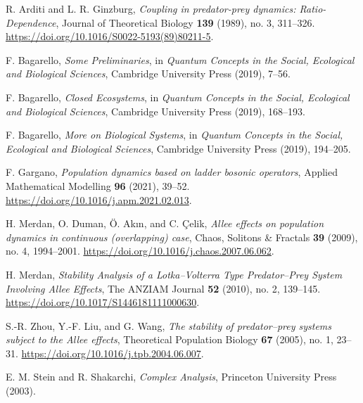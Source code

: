 \documentclass[11pt,reqno]{amsart}
\numberwithin{equation}{section}
\theoremstyle{plain}
\begin{document}
\begin{thebibliography}{ABGM19} %

R. Arditi and L. R. Ginzburg, \emph{Coupling in predator-prey dynamics: Ratio-Dependence}, Journal of Theoretical Biology \textbf{139} (1989), no. 3, 311--326. \href{https://doi.org/10.1016/S0022-5193(89)80211-5}{https://doi.org/10.1016/S0022-5193(89)80211-5}.

F. Bagarello, \emph{Some Preliminaries}, in \emph{Quantum Concepts in the Social, Ecological and Biological Sciences}, Cambridge University Press (2019), 7--56.

F. Bagarello, \emph{Closed Ecosystems}, in \emph{Quantum Concepts in the Social, Ecological and Biological Sciences}, Cambridge University Press (2019), 168--193.

F. Bagarello, \emph{More on Biological Systems}, in \emph{Quantum Concepts in the Social, Ecological and Biological Sciences}, Cambridge University Press (2019), 194--205.

F. Gargano, \emph{Population dynamics based on ladder bosonic operators}, Applied Mathematical Modelling \textbf{96} (2021), 39--52. \href{https://doi.org/10.1016/j.apm.2021.02.013}{https://doi.org/10.1016/j.apm.2021.02.013}.

H. Merdan, O. Duman, Ö. Akın, and C. Çelik, \emph{Allee effects on population dynamics in continuous (overlapping) case}, Chaos, Solitons \& Fractals \textbf{39} (2009), no. 4, 1994--2001. \href{https://doi.org/10.1016/j.chaos.2007.06.062}{https://doi.org/10.1016/j.chaos.2007.06.062}.

H. Merdan, \emph{Stability Analysis of a Lotka–Volterra Type Predator–Prey System Involving Allee Effects}, The ANZIAM Journal \textbf{52} (2010), no. 2, 139--145. \href{https://doi.org/10.1017/S1446181111000630}{https://doi.org/10.1017/S1446181111000630}.

S.-R. Zhou, Y.-F. Liu, and G. Wang, \emph{The stability of predator–prey systems subject to the Allee effects}, Theoretical Population Biology \textbf{67} (2005), no. 1, 23--31. \href{https://doi.org/10.1016/j.tpb.2004.06.007}{https://doi.org/10.1016/j.tpb.2004.06.007}.


E. M. Stein and R. Shakarchi, \emph{Complex Analysis}, Princeton University Press (2003).


\end{thebibliography}


\ \\
\end{document}

